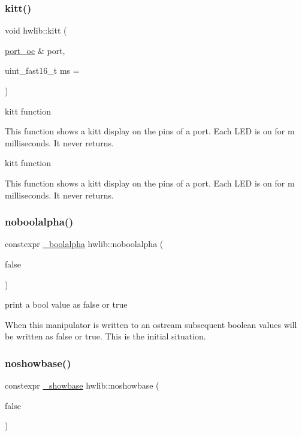 \subsubsection{\texorpdfstring{kitt()}{kitt()}\hspace{0.1cm}{\footnotesize\ttfamily [3/3]}}
{\footnotesize\ttfamily void hwlib\+::kitt (\begin{DoxyParamCaption}\item[{\hyperlink{classhwlib_1_1port__oc}{port\+\_\+oc} \&}]{port,  }\item[{uint\+\_\+fast16\+\_\+t}]{ms = {} }\end{DoxyParamCaption})}



kitt function 

This function shows a kitt display on the pins of a port. Each L\+ED is on for m milliseconds. It never returns.

kitt function

This function shows a kitt display on the pins of a port. Each L\+ED is on for m milliseconds. It never returns. \mbox{\label{namespacehwlib_a6fe77cc67d9850cb262eb6e15e37724d}} 
\subsubsection{\texorpdfstring{noboolalpha()}{noboolalpha()}}
{\footnotesize\ttfamily constexpr \hyperlink{structhwlib_1_1__boolalpha}{\+\_\+boolalpha} hwlib\+::noboolalpha (\begin{DoxyParamCaption}\item[{false}]{ }\end{DoxyParamCaption})}

print a bool value as \textquotesingle{}false\textquotesingle{} or \textquotesingle{}true\textquotesingle{}

When this manipulator is written to an ostream subsequent boolean values will be written as \textquotesingle{}false\textquotesingle{} or \textquotesingle{}true\textquotesingle{}. This is the initial situation. \mbox{\label{namespacehwlib_af813ae25dc70ae85e2f06dcf81f8963b}} 
\subsubsection{\texorpdfstring{noshowbase()}{noshowbase()}}
{\footnotesize\ttfamily constexpr \hyperlink{structhwlib_1_1__showbase}{\+\_\+showbase} hwlib\+::noshowbase (\begin{DoxyParamCaption}\item[{false}]{ }\end{DoxyParamCaption})}


